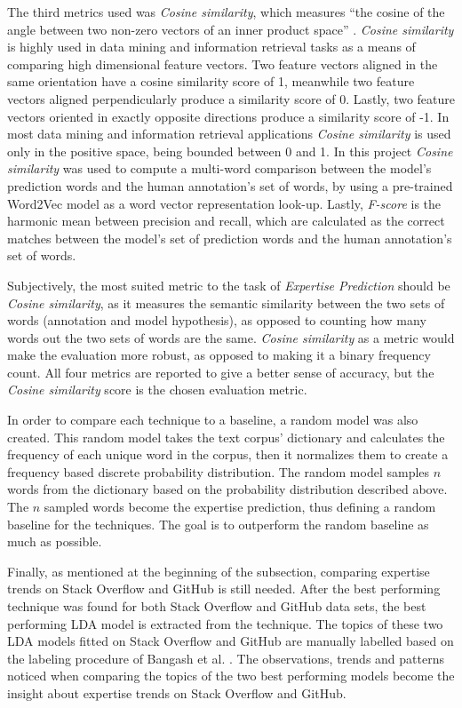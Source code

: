        The third metrics used was \emph{Cosine similarity}, which measures ``the cosine of the angle between two non-zero vectors of an inner product space'' \cite{cosSim_def}. \emph{Cosine similarity} is highly used in data mining and information retrieval tasks as a means of comparing high dimensional feature vectors. Two feature vectors aligned in the same orientation have a cosine similarity score of 1, meanwhile two feature vectors aligned perpendicularly produce a similarity score of 0. Lastly, two feature vectors oriented in exactly opposite directions produce a similarity score of -1. In most data mining and information retrieval applications \emph{Cosine similarity} is used only in the positive space, being bounded between 0 and 1. In this project \emph{Cosine similarity} was used to compute a multi-word comparison between the model's prediction words and the human annotation's set of words, by using a pre-trained Word2Vec model\cite{efstathiou2018word} as a word vector representation look-up. Lastly, \emph{F-score} is the harmonic mean between precision and recall, which are calculated as the correct matches between the model's set of prediction words and the human annotation's set of words.
       
       Subjectively, the most suited metric to the task of \emph{Expertise Prediction} should be \emph{Cosine similarity}, as it measures the semantic similarity between the two sets of words (annotation and model hypothesis), as opposed to counting how many words out the two sets of words are the same. \emph{Cosine similarity} as a metric would make the evaluation more robust, as opposed to making it a binary frequency count. All four metrics are reported to give a better sense of accuracy, but the \emph{Cosine similarity} score is the chosen evaluation metric.
        
        In order to compare each technique to a baseline, a random model was also created. This random model takes the text corpus' dictionary and calculates the frequency of each unique word in the corpus, then it normalizes them to create a frequency based discrete probability distribution. The random model samples $n$ words from the dictionary based on the probability distribution described above. The $n$ sampled words become the expertise prediction, thus defining a random baseline for the techniques. The goal is to outperform the random baseline as much as possible.
        
        Finally, as mentioned at the beginning of the subsection, comparing expertise trends on Stack Overflow and GitHub is still needed. After the best performing technique was found for both Stack Overflow and GitHub data sets, the best performing LDA model is extracted from the technique. The topics of these two LDA models fitted on Stack Overflow and GitHub are manually labelled based on the labeling procedure of Bangash et al. \cite{bangash2019developers}. The observations, trends and patterns noticed when comparing the topics of the two best performing models become the insight about expertise trends on Stack Overflow and GitHub.
     
